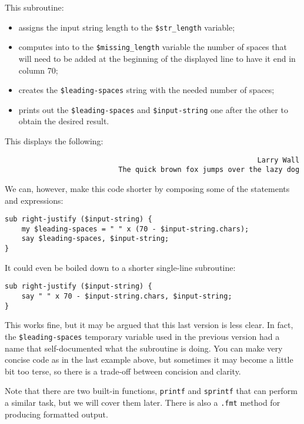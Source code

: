 This subroutine:
\begin{itemize}
\item assigns the input string length to the \verb'$str_length' variable;
\item computes into to the \verb'$missing_length' variable the 
number of spaces that will need to be added at the beginning 
of the displayed line to have it end in column 70;
\item creates the \verb'$leading-spaces' string with the 
needed number of spaces;
\item prints out the \verb'$leading-spaces' and 
\verb'$input-string' one after the other to obtain the desired 
result.
\end{itemize}

This displays the following:

\begin{verbatim}
                                                            Larry Wall
                           The quick brown fox jumps over the lazy dog
\end{verbatim}

We can, however, make this code shorter by composing some of the 
statements and expressions:

\begin{verbatim}
sub right-justify ($input-string) {
    my $leading-spaces = " " x (70 - $input-string.chars);
    say $leading-spaces, $input-string;
}
\end{verbatim}

It could even be boiled down to a shorter single-line subroutine:

\begin{verbatim}
sub right-justify ($input-string) {
    say " " x 70 - $input-string.chars, $input-string;
}
\end{verbatim}

This works fine, but it may be argued that this last version is 
less clear. In fact, the \verb'$leading-spaces' temporary 
variable used in the previous version had a name that 
self-documented what the subroutine is doing. You can make 
very concise code as in the last example above, but sometimes 
it may become a little bit too terse, so there is a trade-off 
between concision and clarity.

Note that there are two built-in functions, {\tt printf} and 
{\tt sprintf} that can perform a similar task, but we will 
cover them later. There is also a \verb'.fmt' method for 
producing formatted output.

